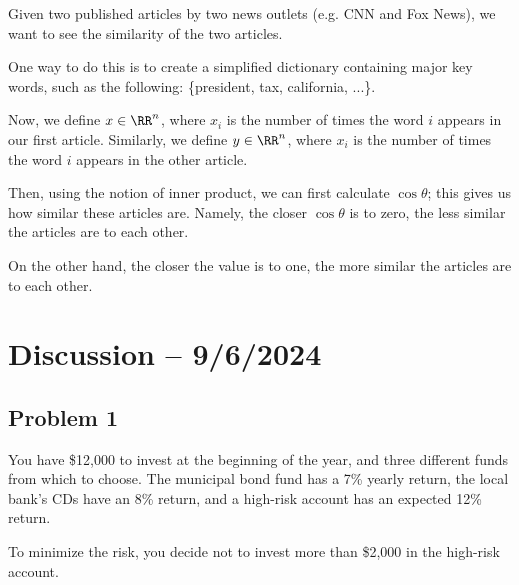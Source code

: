 \documentclass[openany]{book}
\begin{document}
\begin{example}
	Given two published articles by two news outlets (e.g. CNN and Fox News), we want to see the similarity of the two articles.
	
	One way to do this is to create a simplified dictionary containing major key words, such as the following: \{president, tax, california, ...\}.
	
	Now, we define $x \in \RR^{n}$, where $x_i$ is the number of times the word $i$ appears in our first article. Similarly, we define $y \in \RR^{n}$, where $x_i$ is the number of times the word $i$ appears in the other article.
	
	Then, using the notion of inner product, we can first calculate $\cos \theta$; this gives us how similar these articles are. Namely, the closer $\cos \theta$ is to zero, the less similar the articles are to each other.
	
	On the other hand, the closer the value is to one, the more similar the articles are to each other. 
\end{example}

\section{Discussion -- 9/6/2024}
\subsection{Problem 1}
You have \$12,000 to invest at the beginning of the year, and three different funds from which to choose. The municipal bond fund has a 7\% yearly return, the local bank's CDs have an 8\% return, and a high-risk account has an expected 12\% return.

To minimize the risk, you decide not to invest more than \$2,000 in the high-risk account.
\end{document}
